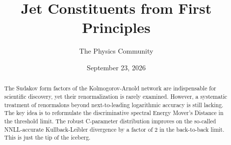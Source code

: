\documentclass[11pt]{article}
\title{Jet Constituents from First Principles}
\author{The Physics Community}
\date{September 23, 2026}
\numberwithin{equation}{section}
\theoremstyle{definition}
\theoremstyle{remark}
\begin{document}
\maketitle
\begin{abstract}
The Sudakov form factors of the Kolmogorov-Arnold network are
indispensable for scientific discovery, yet their renormalization is
rarely examined. However, a systematic treatment of renormalons beyond
next-to-leading logarithmic accuracy is still lacking. The key idea is
to reformulate the discriminative spectral Energy Mover's Distance in
the threshold limit. The robust C-parameter distribution improves on the
so-called NNLL-accurate Kullback-Leibler divergence by a factor of 2 in
the back-to-back limit. This is just the tip of the iceberg.
\end{abstract}
\tableofcontents





\nocite{*}


\end{document}
